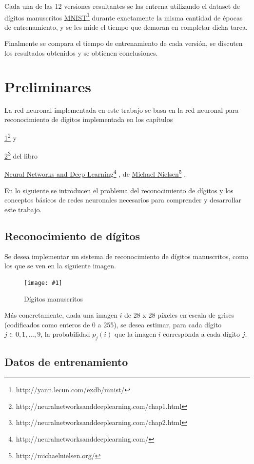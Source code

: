 \documentclass[a4paper, 10pt, twoside]{article}
\newcommand{\img}[3]{
  \begin{figure}[H]
    \begin{center}
      \texttt{[image: \#1]}
    \end{center}
    \caption{#2}
    \label{#3}
  \end{figure}
}
\newcommand{\link}[2]{
  \href{#1}{#2}\footnote{#1}
}
\begin{document}
Cada una de las 12 versiones resultantes se las entrena utilizando el dataset
de dígitos manuscritos \link{http://yann.lecun.com/exdb/mnist/}{MNIST} durante
exactamente la misma cantidad de épocas de entrenamiento, y se les mide el
tiempo que demoran en completar dicha tarea.

Finalmente se compara el tiempo de entrenamiento de cada versión, se discuten
los resultados obtenidos y se obtienen conclusiones.




\section{Preliminares}

La red neuronal implementada en este trabajo se basa en la red neuronal para
reconocimiento de dígitos implementada en los capítulos
\link{http://neuralnetworksanddeeplearning.com/chap1.html}{1} y
\link{http://neuralnetworksanddeeplearning.com/chap2.html}{2} del libro
\link{http://neuralnetworksanddeeplearning.com/}{Neural Networks and Deep
Learning}, de \link{http://michaelnielsen.org/}{Michael Nielsen}.

En lo siguiente se introducen el problema del reconocimiento de dígitos y los
conceptos básicos de redes neuronales necesarios para comprender y desarrollar
este trabajo.


\subsection{Reconocimiento de dígitos}

Se desea implementar un sistema de reconocimiento de dígitos manuscritos, como
los que se ven en la siguiente imagen.

\img{digits.png}{Dígitos manuscritos}{img:digits}

Más concretamente, dada una imagen $i$ de 28 x 28 pixeles en escala de grises
(codificados como enteros de 0 a 255), se desea estimar, para cada dígito $j
\in {0, 1, \ldots, 9}$, la probabilidad $p_j(i)$ que la imagen $i$ corresponda
a cada dígito $j$.


\subsection{Datos de entrenamiento}
\end{document}
